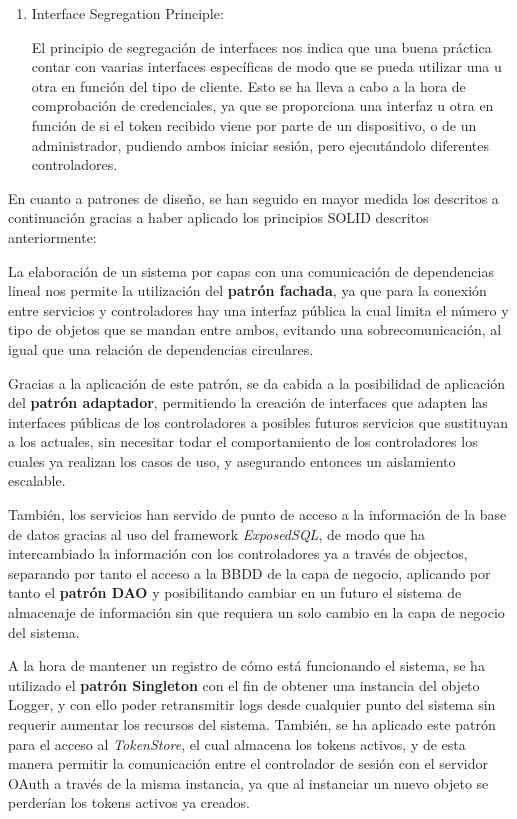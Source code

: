 \begin{enumerate}
            \item Interface Segregation Principle:
            
            El principio de segregación de interfaces nos indica que una buena práctica contar con vaarias interfaces específicas de modo que se pueda utilizar una u otra en función del tipo de cliente.
            Esto se ha lleva a cabo a la hora de comprobación de credenciales, ya que se proporciona una interfaz u otra en función de si el token recibido viene por parte de un dispositivo, o de un administrador, pudiendo ambos iniciar sesión, pero ejecutándolo diferentes controladores.
            
        \end{enumerate}
        
        En cuanto a patrones de diseño, se han seguido en mayor medida los descritos a continuación gracias a haber aplicado los principios SOLID descritos anteriormente:
        
        La elaboración de un sistema por capas con una comunicación de dependencias lineal nos permite la utilización del \textbf{patrón fachada}, ya que para la conexión entre servicios y controladores hay una interfaz pública la cual limita el número y tipo de objetos que se mandan entre ambos, evitando una sobrecomunicación, al igual que una relación de dependencias circulares.
        
        Gracias a la aplicación de este patrón, se da cabida a la posibilidad de aplicación del \textbf{patrón adaptador}, permitiendo la creación de interfaces que adapten las interfaces públicas de los controladores a posibles futuros servicios que sustituyan a los actuales, sin necesitar todar el comportamiento de los controladores los cuales ya realizan los casos de uso, y asegurando entonces un aislamiento escalable.
        
        También, los servicios han servido de punto de acceso a la información de la base de datos gracias al uso del framework \textit{ExposedSQL}, de modo que ha intercambiado la información con los controladores ya a través de objectos, separando por tanto el acceso a la BBDD de la capa de negocio, aplicando por tanto el \textbf{patrón DAO} y posibilitando cambiar en un futuro el sistema de almacenaje de información sin que requiera un solo cambio en la capa de negocio del sistema.
        
        A la hora de mantener un registro de cómo está funcionando el sistema, se ha utilizado el \textbf{patrón Singleton} con el fin de obtener una instancia del objeto Logger, y con ello poder retransmitir logs desde cualquier punto del sistema sin requerir aumentar los recursos del sistema. También, se ha aplicado este patrón para el acceso al \textit{TokenStore}, el cual almacena los tokens activos, y de esta manera permitir la comunicación entre el controlador de sesión con el servidor OAuth a través de la misma instancia, ya que al instanciar un nuevo objeto se perderían los tokens activos ya creados.
    
